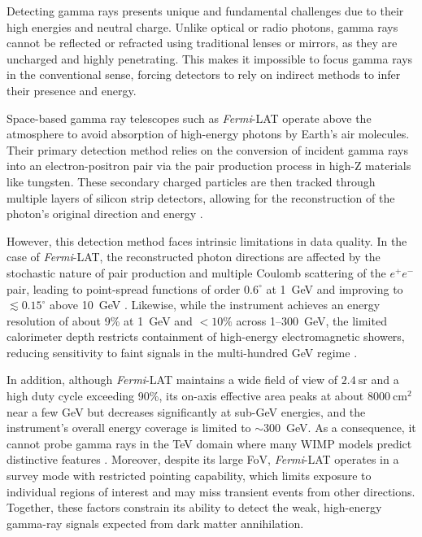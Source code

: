 \documentclass{aastex701}
\begin{document}
Detecting gamma rays presents unique and fundamental challenges due to their high energies and neutral charge. Unlike optical or radio photons, gamma rays cannot be reflected or refracted using traditional lenses or mirrors, as they are uncharged and highly penetrating. This makes it impossible to focus gamma rays in the conventional sense, forcing detectors to rely on indirect methods to infer their presence and energy.

Space-based gamma ray telescopes such as \textit{Fermi}-LAT operate above the atmosphere to avoid absorption of high-energy photons by Earth's air molecules. Their primary detection method relies on the conversion of incident gamma rays into an electron-positron pair via the pair production process in high-Z materials like tungsten. These secondary charged particles are then tracked through multiple layers of silicon strip detectors, allowing for the reconstruction of the photon's original direction and energy \cite{Atwood2009}.

However, this detection method faces intrinsic limitations in data quality. In the case of \textit{Fermi}-LAT, the reconstructed photon directions are affected by the stochastic nature of pair production and multiple Coulomb scattering of the $e^+e^-$ pair, leading to point-spread functions of order $0.6^\circ$ at 1~GeV and improving to $\lesssim 0.15^\circ$ above 10~GeV \cite{FermiLAT_EnergyResolution}. Likewise, while the instrument achieves an energy resolution of about 9\% at 1~GeV and $<10\%$ across 1–300~GeV, the limited calorimeter depth restricts containment of high-energy electromagnetic showers, reducing sensitivity to faint signals in the multi-hundred GeV regime \cite{Ackermann2012}.

In addition, although \textit{Fermi}-LAT maintains a wide field of view of \(2.4~\mathrm{sr}\) and a high duty cycle exceeding 90\%, its on-axis effective area peaks at about \(8000~\mathrm{cm}^2\) near a few GeV but decreases significantly at sub-GeV energies, and the instrument’s overall energy coverage is limited to $\sim$300~GeV. As a consequence, it cannot probe gamma rays in the TeV domain where many WIMP models predict distinctive features \cite{MAGIC:2022qdl}. Moreover, despite its large FoV, \textit{Fermi}-LAT operates in a survey mode with restricted pointing capability, which limits exposure to individual regions of interest and may miss transient events from other directions. Together, these factors constrain its ability to detect the weak, high-energy gamma-ray signals expected from dark matter annihilation.
\end{document}
